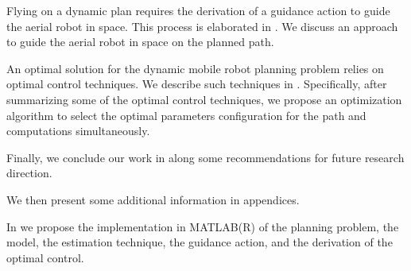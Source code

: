 Flying on a dynamic plan requires the derivation of a guidance action to guide the aerial robot in space. This process is elaborated in . We discuss an approach to guide the aerial robot in space on the planned path.

An optimal solution for the dynamic mobile robot planning problem relies on optimal control techniques. We describe such techniques in . Specifically, after summarizing some of the optimal control techniques, we propose an optimization algorithm to select the optimal parameters configuration for the path and computations simultaneously.

Finally, we conclude our work in  along some recommendations for future research direction.

We then present some additional information in appendices.

In  we propose the implementation in MATLAB(R) of the planning problem, the model, the estimation technique, the guidance action, and the derivation of the optimal control. 

